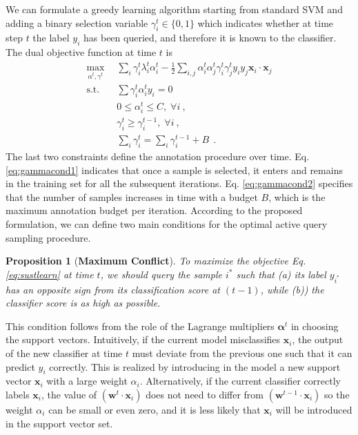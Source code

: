 \documentclass[10pt,twocolumn,letterpaper]{article}
\newcommand{\mb}[1]{\bm #1}
\newtheorem{proposition}[theorem]{Proposition}
\newcommand{\eqr}[1]{Eq. \eqref{#1}}
\begin{document}

We can formulate a greedy learning algorithm starting from standard SVM and adding a binary selection 
variable $\gamma_i^t\in \{0, 1\}$ which indicates whether at time 
step $t$ the label $y_i$ has been queried, and therefore it is known to the classifier.
The dual objective function at time $t$ is
\begin{align}
\max_{\alpha^t, \gamma^t}&\sum_i \gamma_i^t\lambda_i^t\alpha_i^t 
                        - \frac{1}{2} \sum_{i, j} \alpha_i^t \alpha_j^t \gamma_i^t \gamma_j^t y_i y_j\mb{x}_i\cdot \mb{x}_j \label{eq:sustlearn}\\
\textrm{s.t.} \quad & \sum \gamma_i^t \alpha^t_i y_i  = 0 \label{eq:sustlearn_equilibrium}\\
                    & 0 \leq \alpha^t_i \leq C, \; \forall i ~,\label{eq:sustlearn_positivealpha}\\
                    &\gamma_i^t \geq \gamma_i^{t-1}, \; \forall i ~,\label{eq:gammacond1}\\
		    &\sum_i \gamma_i^t = \sum_i \gamma_i^{t-1} +B~ \label{eq:gammacond2}~.
\end{align}
The last two constraints define the annotation procedure over time.
\eqr{eq:gammacond1} indicates that once a sample is selected, it enters and remains in the training 
set for all the subsequent iterations. \eqr{eq:gammacond2} specifies that the number of samples 
increases in time with a budget $B$, which is the maximum annotation budget per iteration. 
According to the proposed formulation, we can define two main conditions for the optimal active
query sampling procedure. 

\begin{proposition}[\textbf{Maximum Conflict}]
To maximize the objective \eqr{eq:sustlearn} at time $t$, we should query the sample $i^*$ such that \emph{(a)} 
its label $y_{i^*}$ has an opposite sign from its classification score at $(t-1)$, 
while \emph{(b))} the classifier score is as high as possible. 
\label{prop1}
\end{proposition}
This condition follows from the role of the Lagrange multipliers $\mathbf{\alpha}^t$ in choosing the support vectors.
Intuitively, if the current model misclassifies $\mb{x}_i$, the output of the new 
classifier at time $t$ must deviate from the previous one such that it can predict $y_i$ correctly. 
This is realized by introducing in the model a new support vector $\mb{x}_i$ with a large weight $\alpha_i$.
Alternatively, if the current classifier correctly labels $\mb{x}_i$, the value of $(\mb{w}^{t}\cdot\mb{x}_i)$ 
does not need to differ from $\left(\mb{w}^{t-1}\cdot\mb{x}_i\right)$ so the weight $\alpha_i$ 
can be small or even zero, and it is less likely that $\mb{x}_i$ will be introduced in the support vector set.
\end{document}
